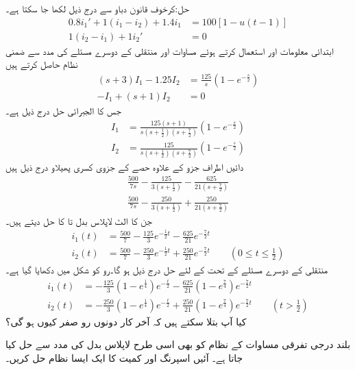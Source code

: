 حل:کرخوف قانون دباو سے درج ذیل لکھا جا سکتا ہے۔
\begin{align*}
0.8i_1'+1(i_1-i_2)+1.4i_1&=100[1-u(t-1)]\\
1(i_2-i_1)+1i_2'&=0
\end{align*}
ابتدائی معلومات  اور  استعمال کرتے ہوئے مساوات  اور منتقلی کے دوسرے مسئلے کی مدد سے ضمنی نظام حاصل کرتے ہیں
\begin{align*}
(s+3)I_1-1.25I_2&=\frac{125}{s}(1-e^{-\frac{s}{2}})\\
-I_1+(s+1)I_2&=0
\end{align*}
جس کا الجبرائی حل درج ذیل ہے۔
\begin{align*}
I_1&=\frac{125(s+1)}{s(s+\frac{1}{2})(s+\frac{7}{2})}(1-e^{-\frac{s}{2}})\\
I_2&=\frac{125}{s(s+\frac{1}{2})(s+\frac{7}{2})}(1-e^{-\frac{s}{2}})
\end{align*}
دائیں اطراف جزو  کے علاوہ حصے کے جزوی کسری پھیلاو درج ذیل ہیں
\begin{align*}
\frac{500}{7s}-\frac{125}{3(s+\frac{1}{2})}-\frac{625}{21(s+\frac{7}{2})}\\
\frac{500}{7s}-\frac{250}{3(s+\frac{1}{2})}+\frac{250}{21(s+\frac{7}{2})}
\end{align*}
جن کا الٹ لاپلاس بدل  تا  کا حل دیتے ہیں۔ 
\begin{align*}
i_1(t)&=\frac{500}{7}-\frac{125}{3}e^{-\frac{1}{2}t}-\frac{625}{21}e^{-\frac{7}{2}t}\\
i_2(t)&=\frac{500}{7}-\frac{250}{3}e^{-\frac{1}{2}t}+\frac{250}{21}e^{-\frac{7}{2}t}\quad \quad (0\le t \le \frac{1}{2})
\end{align*}
منتقلی کے دوسرے مسئلے کے تحت  کے لئے حل  درج ذیل ہو گا۔رو کو شکل  میں دکھایا گیا ہے۔
\begin{align*}
i_1(t)&=-\frac{125}{3}(1-e^{\frac{1}{4}})e^{-\frac{t}{2}}-\frac{625}{21}(1-e^{\frac{7}{4}})e^{-\frac{7}{2}t}\\
i_2(t)&=-\frac{250}{3}(1-e^{\frac{1}{4}})e^{-\frac{t}{2}}+\frac{250}{21}(1-e^{\frac{7}{4}})e^{-\frac{7}{2}t}\quad \quad (t>\frac{1}{2}) 
\end{align*}
کیا آپ بتلا سکتے ہیں کہ آخر کار دونوں رو صفر کیوں ہو گی؟ 

بلند درجی تفرقی مساوات کے نظام کو بھی اسی طرح لاپلاس بدل کی مدد سے حل کیا جاتا ہے۔ آئیں اسپرنگ اور کمیت کا ایک ایسا نظام حل کریں۔

